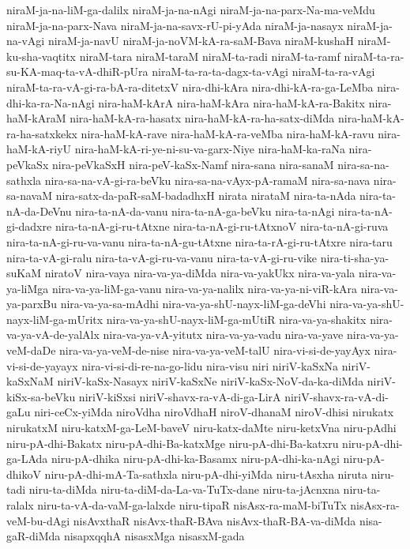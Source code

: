 {niraM-ja-na-liM-ga-dalilx
niraM-ja-na-nAgi
niraM-ja-na-parx-Na-ma-veMdu
niraM-ja-na-parx-Nava
niraM-ja-na-savx-rU-pi-yAda
niraM-ja-nasayx
niraM-ja-na-vAgi
niraM-ja-navU
niraM-ja-noVM-kA-ra-saM-Bava
niraM-kushaH
niraM-ku-sha-vaqtitx
niraM-tara
niraM-taraM
niraM-ta-radi
niraM-ta-ramf
niraM-ta-ra-su-KA-maq-ta-vA-dhiR-pUra
niraM-ta-ra-ta-dagx-ta-vAgi
niraM-ta-ra-vAgi
niraM-ta-ra-vA-gi-ra-bA-ra-ditetxV
nira-dhi-kAra
nira-dhi-kA-ra-ga-LeMba
nira-dhi-ka-ra-Na-nAgi
nira-haM-kArA
nira-haM-kAra
nira-haM-kA-ra-Bakitx
nira-haM-kAraM
nira-haM-kA-ra-hasatx
nira-haM-kA-ra-ha-satx-diMda
nira-haM-kA-ra-ha-satxkekx
nira-haM-kA-rave
nira-haM-kA-ra-veMba
nira-haM-kA-ravu
nira-haM-kA-riyU
nira-haM-kA-ri-ye-ni-su-va-garx-Niye
nira-haM-ka-raNa
nira-peVkaSx
nira-peVkaSxH
nira-peV-kaSx-Namf
nira-sana
nira-sanaM
nira-sa-na-sathxla
nira-sa-na-vA-gi-ra-beVku
nira-sa-na-vAyx-pA-ramaM
nira-sa-nava
nira-sa-navaM
nira-satx-da-paR-saM-badadhxH
nirata
nirataM
nira-ta-nAda
nira-ta-nA-da-DeVnu
nira-ta-nA-da-vanu
nira-ta-nA-ga-beVku
nira-ta-nAgi
nira-ta-nA-gi-dadxre
nira-ta-nA-gi-ru-tAtxne
nira-ta-nA-gi-ru-tAtxnoV
nira-ta-nA-gi-ruva
nira-ta-nA-gi-ru-va-vanu
nira-ta-nA-gu-tAtxne
nira-ta-rA-gi-ru-tAtxre
nira-taru
nira-ta-vA-gi-ralu
nira-ta-vA-gi-ru-va-vanu
nira-ta-vA-gi-ru-vike
nira-ti-sha-ya-suKaM
niratoV
nira-vaya
nira-va-ya-diMda
nira-va-yakUkx
nira-va-yala
nira-va-ya-liMga
nira-va-ya-liM-ga-vanu
nira-va-ya-nalilx
nira-va-ya-ni-viR-kAra
nira-va-ya-parxBu
nira-va-ya-sa-mAdhi
nira-va-ya-shU-nayx-liM-ga-deVhi
nira-va-ya-shU-nayx-liM-ga-mUritx
nira-va-ya-shU-nayx-liM-ga-mUtiR
nira-va-ya-shakitx
nira-va-ya-vA-de-yalAlx
nira-va-ya-vA-yitutx
nira-va-ya-vadu
nira-va-yave
nira-va-ya-veM-daDe
nira-va-ya-veM-de-nise
nira-va-ya-veM-talU
nira-vi-si-de-yayAyx
nira-vi-si-de-yayayx
nira-vi-si-di-re-na-go-lidu
nira-visu
niri
niriV-kaSxNa
niriV-kaSxNaM
niriV-kaSx-Nasayx
niriV-kaSxNe
niriV-kaSx-NoV-da-ka-diMda
niriV-kiSx-sa-beVku
niriV-kiSxsi
niriV-shavx-ra-vA-di-ga-LirA
niriV-shavx-ra-vA-di-gaLu
niri-ceCx-yiMda
niroVdha
niroVdhaH
niroV-dhanaM
niroV-dhisi
nirukatx
nirukatxM
niru-katxM-ga-LeM-baveV
niru-katx-daMte
niru-ketxVna
niru-pAdhi
niru-pA-dhi-Bakatx
niru-pA-dhi-Ba-katxMge
niru-pA-dhi-Ba-katxru
niru-pA-dhi-ga-LAda
niru-pA-dhika
niru-pA-dhi-ka-Basamx
niru-pA-dhi-ka-nAgi
niru-pA-dhikoV
niru-pA-dhi-mA-Ta-sathxla
niru-pA-dhi-yiMda
niru-tAsxha
niruta
niru-tadi
niru-ta-diMda
niru-ta-diM-da-La-va-TuTx-dane
niru-ta-jAcnxna
niru-ta-ralalx
niru-ta-vA-da-vaM-ga-lalxde
niru-tipaR
nisAsx-ra-maM-biTuTx
nisAsx-ra-veM-bu-dAgi
nisAvxthaR
nisAvx-thaR-BAva
nisAvx-thaR-BA-va-diMda
nisa-gaR-diMda
nisapxqqhA
nisasxMga
nisasxM-gada
}
